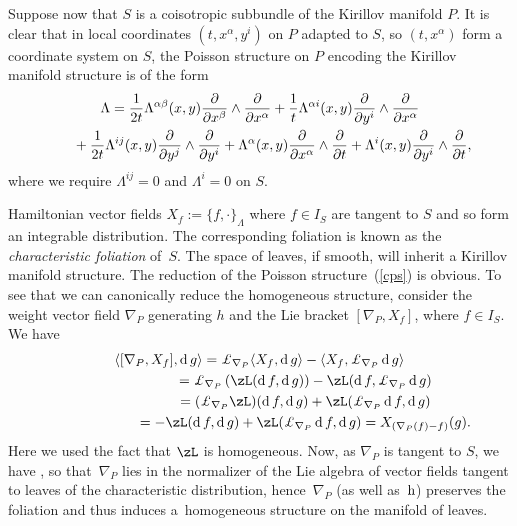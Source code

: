 \documentclass[10pt,a4paper]{amsart}
\newcommand{\rmh}{\textnormal{h}}
\newcommand{\Ll}{{\pounds}}
\def\lan{\langle}
\def\ran{\rangle}
\def\xd{\operatorname{d}}
\numberwithin{equation}{section}
\begin{document}
Suppose now that $S$ is a coisotropic subbundle of the Kirillov manifold $P$. It is clear that in local coordinates $(t, x^{\alpha}, y^{i})$ on $P$ adapted to $S$, so $(t, x^{\alpha})$ form a coordinate system on $S$, the Poisson structure on $P$ encoding the Kirillov manifold structure is of the form
\begin{gather}
\Lambda = \frac{1}{2t} \Lambda^{\alpha \beta}(x,y)\frac{\partial}{\partial x^{\beta}} \wedge\frac{\partial}{\partial x^{\alpha}} + \frac{1}{t}\Lambda^{\alpha i}(x,y)\frac{\partial}{\partial y^{i}} \wedge \frac{\partial}{\partial x^{\alpha}}\nonumber\\
\hphantom{\Lambda =}{} + \frac{1}{2t} \Lambda^{ij}(x,y)\frac{\partial}{\partial y^{j}} \wedge\frac{\partial}{\partial y^{i}} + \Lambda^{\alpha}(x,y)\frac{\partial}{\partial x^{\alpha}} \wedge\frac{\partial}{\partial t} + \Lambda^{i}(x,y)\frac{\partial}{\partial y^{i}} \wedge\frac{\partial}{\partial t}, \label{cps}
\end{gather}
where we require $\Lambda^{ij}=0$ and $\Lambda^{i}=0$ on $S$.

Hamiltonian vector f\/ields $X_{f} := \{ f, \cdot\}_{\Lambda}$ where $f \in I_{S}$ are tangent to $S$ and so form an integrable distribution. The corresponding foliation is known as the \emph{characteristic foliation} of~$S$. The space of leaves, if smooth, will inherit a Kirillov manifold structure. The reduction of the Poisson structure~(\ref{cps}) is obvious. To see that we can canonically reduce the homogeneous structure, consider the weight vector f\/ield $\nabla_P$ generating $h$ and the Lie bracket $[\nabla_P,X_f]$, where $f\in I_S$. We have
\begin{gather*} \lan[\nabla_P,X_f],\xd g\ran= \Ll_{\nabla_P}\lan {X_f},{\xd g}\ran-\lan X_f,\Ll_{\nabla_P}\xd g\ran\\
\hphantom{\lan[\nabla_P,X_f],\xd g\ran}{} = \Ll_{\nabla_P}\left(\zL(\xd f,\xd g)\right)-\zL(\xd f,\Ll_{\nabla_P}\xd g)\\
\hphantom{\lan[\nabla_P,X_f],\xd g\ran}{} = (\Ll_{\nabla_P}\zL)(\xd f,\xd g) +\zL(\Ll_{\nabla_P}\xd f,\xd g)\\
\hphantom{\lan[\nabla_P,X_f],\xd g\ran}{} = -\zL(\xd f,\xd g)+\zL(\Ll_{\nabla_P}\xd f,\xd g)=X_{(\nabla_P(f)-f)}(g).
\end{gather*}
Here we used the fact that $\zL$ is homogeneous. Now, as $\nabla_P$ is tangent to $S$, we have , so that~$\nabla_P$ lies in the normalizer of the Lie algebra of vector f\/ields tangent to leaves of the characteristic distribution, hence~$\nabla_P$ (as well as~$\rmh$) preserves the foliation and thus induces a~homogeneous structure on the manifold of leaves.
\end{document}
